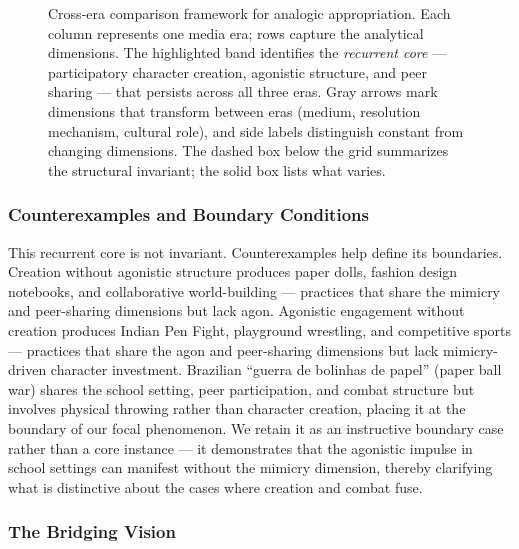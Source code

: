 \documentclass[12pt]{article}
\begin{document}
\begin{figure}[htbp]
\caption{Cross-era comparison framework for analogic appropriation. Each column represents one media era; rows capture the analytical dimensions. The highlighted band identifies the \emph{recurrent core} --- participatory character creation, agonistic structure, and peer sharing --- that persists across all three eras. Gray arrows mark dimensions that transform between eras (medium, resolution mechanism, cultural role), and side labels distinguish constant from changing dimensions. The dashed box below the grid summarizes the structural invariant; the solid box lists what varies.}
\label{fig:cross-era}
\end{figure}

\subsubsection{Counterexamples and Boundary Conditions}

This recurrent core is not invariant. Counterexamples help define its boundaries. Creation without agonistic structure produces paper dolls, fashion design notebooks, and collaborative world-building --- practices that share the mimicry and peer-sharing dimensions but lack agon. Agonistic engagement without creation produces Indian Pen Fight, playground wrestling, and competitive sports --- practices that share the agon and peer-sharing dimensions but lack mimicry-driven character investment. Brazilian ``guerra de bolinhas de papel'' (paper ball war) shares the school setting, peer participation, and combat structure but involves physical throwing rather than character creation, placing it at the boundary of our focal phenomenon. We retain it as an instructive boundary case rather than a core instance --- it demonstrates that the agonistic impulse in school settings can manifest without the mimicry dimension, thereby clarifying what is distinctive about the cases where creation and combat fuse.

\subsubsection{The Bridging Vision}
\end{document}
